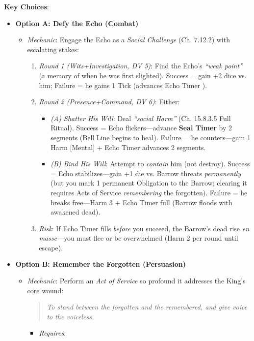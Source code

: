 \documentclass[12pt]{article}
\begin{document}
\textbf{Key Choices}:
\begin{itemize}
  \item \textbf{Option A: Defy the Echo (Combat)}
  \begin{itemize}
    \item \textit{Mechanic}: Engage the Echo as a \textit{Social Challenge} (Ch. 7.12.2) with escalating stakes:
    \begin{enumerate}
      \item \textit{Round 1 (Wits+Investigation, DV 5)}: Find the Echo's \textit{``weak point''} (a memory of when he was first slighted). Success = gain +2 dice vs. him; Failure = he gains 1 Tick (advances Echo Timer ).
      \item \textit{Round 2 (Presence+Command, DV 6)}: Either:
      \begin{itemize}
        \item \textit{(A) Shatter His Will}: Deal \textit{``social Harm''} (Ch. 15.8.3.5 Full Ritual). Success = Echo flickers---advance \textbf{Seal Timer } by 2 segments (Bell Line begins to heal). Failure = he counters---gain 1 Harm [Mental] + Echo Timer advances 2 segments.
        \item \textit{(B) Bind His Will}: Attempt to \textit{contain} him (not destroy). Success = Echo stabilizes---gain +1 die vs. Barrow threats \textit{permanently} (but you mark 1 permanent Obligation to the Barrow; clearing it requires Acts of Service \textit{remembering} the forgotten). Failure = he breaks free---Harm 3 + Echo Timer full (Barrow floods with awakened dead).
      \end{itemize}
      \item \textit{Risk}: If Echo Timer fills \textit{before} you succeed, the Barrow's dead rise \textit{en masse}---you must flee or be overwhelmed (Harm 2 per round until escape).
    \end{enumerate}
  \end{itemize}
  \item \textbf{Option B: Remember the Forgotten (Persuasion)}
  \begin{itemize}
    \item \textit{Mechanic}: Perform an \textit{Act of Service} so profound it addresses the King's core wound:
    \begin{quote}
      \textit{To stand between the forgotten and the remembered, and give voice to the voiceless.}
    \end{quote}
    \begin{itemize}
      \item \textit{Requires}:

\end{itemize}
\end{itemize}
\end{itemize}
\end{document}
